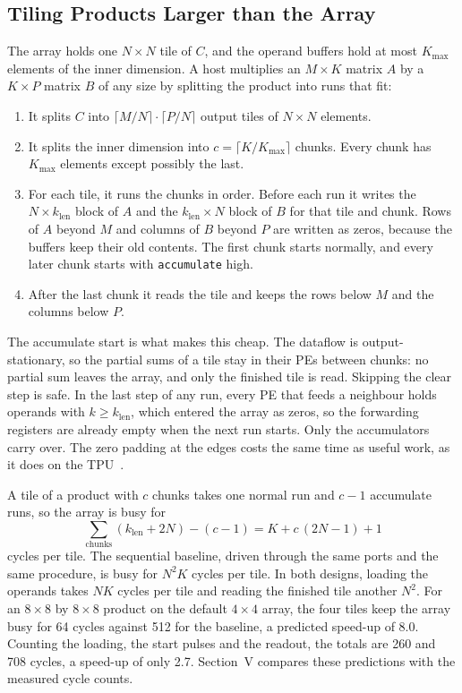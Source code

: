 
\subsection{Tiling Products Larger than the Array}
The array holds one $N \times N$ tile of $C$, and the operand buffers hold at most $K_{\max}$ elements of the inner dimension. A host multiplies an $M \times K$ matrix $A$ by a $K \times P$ matrix $B$ of any size by splitting the product into runs that fit:
\begin{enumerate}
\item It splits $C$ into $\lceil M/N \rceil \cdot \lceil P/N \rceil$ output tiles of $N \times N$ elements.
\item It splits the inner dimension into $c = \lceil K/K_{\max} \rceil$ chunks. Every chunk has $K_{\max}$ elements except possibly the last.
\item For each tile, it runs the chunks in order. Before each run it writes the $N \times k_{\mathrm{len}}$ block of $A$ and the $k_{\mathrm{len}} \times N$ block of $B$ for that tile and chunk. Rows of $A$ beyond $M$ and columns of $B$ beyond $P$ are written as zeros, because the buffers keep their old contents. The first chunk starts normally, and every later chunk starts with \texttt{accumulate} high.
\item After the last chunk it reads the tile and keeps the rows below $M$ and the columns below $P$.
\end{enumerate}

The accumulate start is what makes this cheap. The dataflow is output-stationary, so the partial sums of a tile stay in their PEs between chunks: no partial sum leaves the array, and only the finished tile is read. Skipping the clear step is safe. In the last step of any run, every PE that feeds a neighbour holds operands with $k \geq k_{\mathrm{len}}$, which entered the array as zeros, so the forwarding registers are already empty when the next run starts. Only the accumulators carry over. The zero padding at the edges costs the same time as useful work, as it does on the TPU~\cite{jouppi2017tpu}.

A tile of a product with $c$ chunks takes one normal run and $c - 1$ accumulate runs, so the array is busy for
\begin{equation}
\sum_{\text{chunks}} \left(k_{\mathrm{len}} + 2N\right) - (c - 1) = K + c\,(2N - 1) + 1
\label{eq:tilebusy}
\end{equation}
cycles per tile. The sequential baseline, driven through the same ports and the same procedure, is busy for $N^2 K$ cycles per tile. In both designs, loading the operands takes $NK$ cycles per tile and reading the finished tile another $N^2$. For an $8 \times 8$ by $8 \times 8$ product on the default $4 \times 4$ array, the four tiles keep the array busy for 64 cycles against 512 for the baseline, a predicted speed-up of 8.0. Counting the loading, the start pulses and the readout, the totals are 260 and 708 cycles, a speed-up of only 2.7. Section~V compares these predictions with the measured cycle counts.

